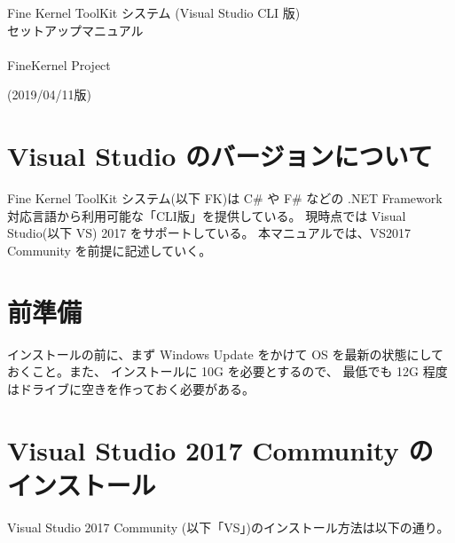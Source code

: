 \documentclass[a4paper]{jsarticle}
\begin{document}
\begin{center}
\begin{Large}
Fine Kernel ToolKit システム (Visual Studio CLI 版) \\
	セットアップマニュアル \\ ~ \\
FineKernel Project \\
\end{Large}
(2019/04/11版)
\end{center}

\section{Visual Studio のバージョンについて}
Fine Kernel ToolKit システム(以下 FK)は 
C\# や F\# などの .NET Framework 対応言語から利用可能な「CLI版」を提供している。
現時点では Visual Studio(以下 VS) 2017 をサポートしている。
本マニュアルでは、VS2017 Community を前提に記述していく。

\section{前準備}

インストールの前に、まず Windows Update をかけて
OS を最新の状態にしておくこと。また、
インストールに 10G を必要とするので、
最低でも 12G 程度はドライブに空きを作っておく必要がある。

\section{Visual Studio 2017 Community のインストール}
Visual Studio 2017 Community (以下「VS」)のインストール方法は以下の通り。
\end{document}
